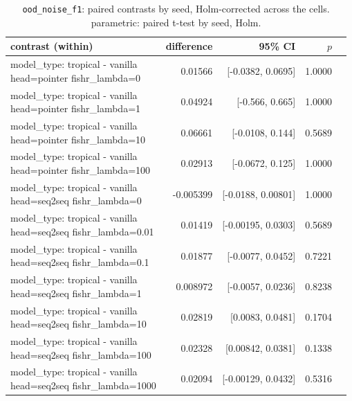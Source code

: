 \documentclass[10pt]{article}
\makeatletter
\newcommand{\stackcell}[1]{\begin{tabular}[t]{@{}l@{}}#1\end{tabular}}
\makeatother
\begin{document}
{\small
\begin{longtable}{lrrrl}
\caption{\texttt{ood\_noise\_f1}: paired contrasts by seed, Holm-corrected across the cells. parametric: paired t-test by seed, Holm.}\label{tab:paired-ood_noise_f1}\\
\toprule
contrast (within) & difference & 95\% CI & $p$ & \\
\midrule
\endhead
\stackcell{model\_type: tropical - vanilla\\\footnotesize head=pointer fishr\_lambda=0 } & 0.01566 & [-0.0382, 0.0695] & 1.0000 & \\
\stackcell{model\_type: tropical - vanilla\\\footnotesize head=pointer fishr\_lambda=1 } & 0.04924 & [-0.566, 0.665] & 1.0000 & \\
\stackcell{model\_type: tropical - vanilla\\\footnotesize head=pointer fishr\_lambda=10 } & 0.06661 & [-0.0108, 0.144] & 0.5689 & \\
\stackcell{model\_type: tropical - vanilla\\\footnotesize head=pointer fishr\_lambda=100 } & 0.02913 & [-0.0672, 0.125] & 1.0000 & \\
\stackcell{model\_type: tropical - vanilla\\\footnotesize head=seq2seq fishr\_lambda=0 } & -0.005399 & [-0.0188, 0.00801] & 1.0000 & \\
\stackcell{model\_type: tropical - vanilla\\\footnotesize head=seq2seq fishr\_lambda=0.01 } & 0.01419 & [-0.00195, 0.0303] & 0.5689 & \\
\stackcell{model\_type: tropical - vanilla\\\footnotesize head=seq2seq fishr\_lambda=0.1 } & 0.01877 & [-0.0077, 0.0452] & 0.7221 & \\
\stackcell{model\_type: tropical - vanilla\\\footnotesize head=seq2seq fishr\_lambda=1 } & 0.008972 & [-0.0057, 0.0236] & 0.8238 & \\
\stackcell{model\_type: tropical - vanilla\\\footnotesize head=seq2seq fishr\_lambda=10 } & 0.02819 & [0.0083, 0.0481] & 0.1704 & \\
\stackcell{model\_type: tropical - vanilla\\\footnotesize head=seq2seq fishr\_lambda=100 } & 0.02328 & [0.00842, 0.0381] & 0.1338 & \\
\stackcell{model\_type: tropical - vanilla\\\footnotesize head=seq2seq fishr\_lambda=1000 } & 0.02094 & [-0.00129, 0.0432] & 0.5316 & \\

\end{longtable}}
\end{document}
